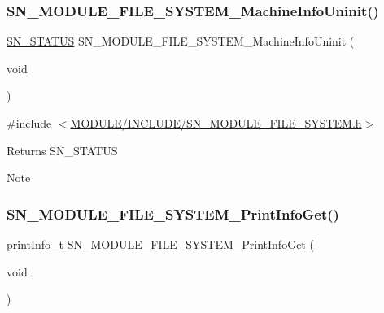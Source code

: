 \subsubsection{\texorpdfstring{S\+N\+\_\+\+M\+O\+D\+U\+L\+E\+\_\+\+F\+I\+L\+E\+\_\+\+S\+Y\+S\+T\+E\+M\+\_\+\+Machine\+Info\+Uninit()}{SN\_MODULE\_FILE\_SYSTEM\_MachineInfoUninit()}}
{\footnotesize\ttfamily \hyperlink{group__SYSTEM__ERROR_ga4540713b9a7a18ce44d78c3a10f7442f}{S\+N\+\_\+\+S\+T\+A\+T\+US} S\+N\+\_\+\+M\+O\+D\+U\+L\+E\+\_\+\+F\+I\+L\+E\+\_\+\+S\+Y\+S\+T\+E\+M\+\_\+\+Machine\+Info\+Uninit (\begin{DoxyParamCaption}\item[{void}]{ }\end{DoxyParamCaption})}



{\ttfamily \#include $<$\hyperlink{SN__MODULE__FILE__SYSTEM_8h}{M\+O\+D\+U\+L\+E/\+I\+N\+C\+L\+U\+D\+E/\+S\+N\+\_\+\+M\+O\+D\+U\+L\+E\+\_\+\+F\+I\+L\+E\+\_\+\+S\+Y\+S\+T\+E\+M.\+h}$>$}

\begin{DoxyReturn}{Returns}
S\+N\+\_\+\+S\+T\+A\+T\+US 
\end{DoxyReturn}
\begin{DoxyNote}{Note}

\end{DoxyNote}
\mbox{\label{group__MODULE__FILE__SYSTEM_ga6679d04769a997531a277ba3940cf16c}} 
\subsubsection{\texorpdfstring{S\+N\+\_\+\+M\+O\+D\+U\+L\+E\+\_\+\+F\+I\+L\+E\+\_\+\+S\+Y\+S\+T\+E\+M\+\_\+\+Print\+Info\+Get()}{SN\_MODULE\_FILE\_SYSTEM\_PrintInfoGet()}}
{\footnotesize\ttfamily \hyperlink{structprint__information}{print\+Info\+\_\+t} S\+N\+\_\+\+M\+O\+D\+U\+L\+E\+\_\+\+F\+I\+L\+E\+\_\+\+S\+Y\+S\+T\+E\+M\+\_\+\+Print\+Info\+Get (\begin{DoxyParamCaption}\item[{void}]{ }\end{DoxyParamCaption})}



